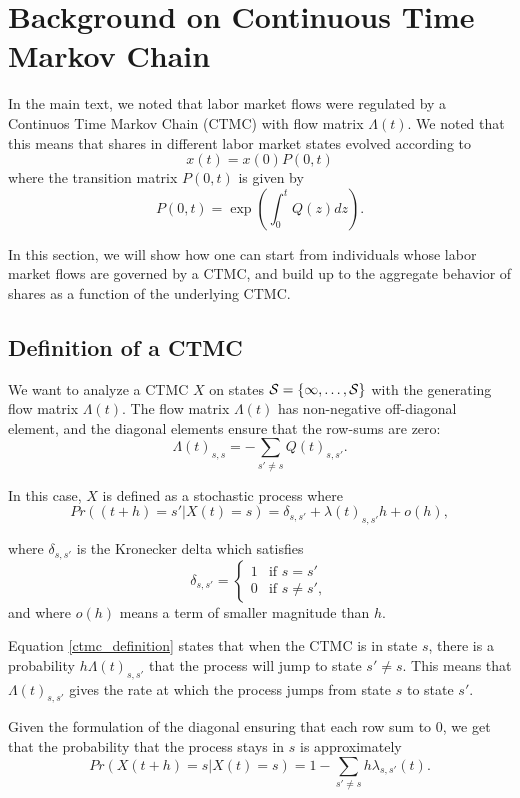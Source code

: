 \documentclass[11pt]{article}
\begin{document}
\section{Background on Continuous Time Markov Chain}
In the main text, we noted that labor market flows were regulated by a Continuos Time Markov Chain (CTMC) with flow matrix $\Lambda(t)$. We noted that this means that shares in different labor market states evolved according to 
\[
x(t) = x(0)P(0,t)
\]
where the transition matrix $P(0,t)$ is given by 
\[
P(0,t) = \exp\left(\int_0^t Q(z)dz\right).
\]

In this section, we will show how one can start from individuals whose labor market flows are governed by a CTMC, and build up to the aggregate behavior of shares as a function of the underlying CTMC.
\subsection{Definition of a CTMC}
\label{sec:ctmc_definition}
We want to analyze a CTMC $X$ on states $\cal{S}=\{1,\dots,S\}$ with the generating flow matrix $\Lambda(t)$. The flow matrix $\Lambda(t)$ has non-negative off-diagonal element, and the diagonal elements ensure that the row-sums are zero:
\[
\Lambda(t)_{s,s} = -\sum_{s'\neq s} Q(t)_{s,s'}.
\] 

In this case, $X$ is defined as a stochastic process where 
\begin{equation}
\label{ctmc_definition}
	Pr((t+h)=s' | X(t) = s) = \delta_{s,s'}+\lambda(t)_{s,s'}h+o(h),
\end{equation}

where $\delta_{s,s'}$ is the Kronecker delta which satisfies
\[
\delta_{s,s'} = \left\{ \begin{array}{cc}
	1 & \mbox{if $s=s'$} \\
	0 & \mbox{if $s\neq s'$},
\end{array}\right.
\]
and where $o(h)$ means a term of smaller magnitude than $h$.

Equation \eqref{ctmc_definition} states that when the CTMC is in state $s$, there is a probability $h \Lambda(t)_{s,s'}$ that the process will jump to state $s'\neq s$. This means that $\Lambda(t)_{s,s'}$ gives the rate at which the process jumps from state $s$ to state $s'$. 

Given the formulation of the diagonal ensuring that each row sum to $0$, we get that the probability that the process stays in $s$ is approximately
\[
Pr(X(t+h)=s | X(t) = s) = 1-\sum_{s'\neq s} h\lambda_{s,s'}(t).
\]
\end{document}
